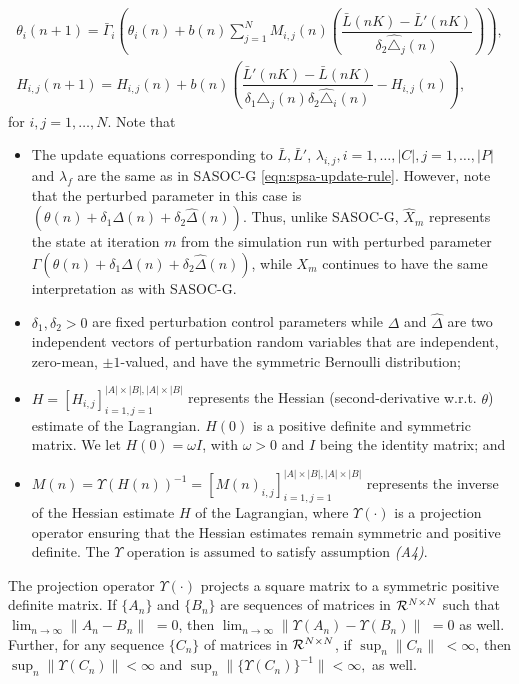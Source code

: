 \documentclass[11pt,letterpaper,english]{article}
\begin{document}
\begin{align}
\label{eqn:hessian-update-rule}
\theta_{i}(n+1)  =  \bar\Gamma_i \left( \theta_{i}(n) + b(n)
\sum\limits_{j = 1}^{N} M_{i, j}(n) \left(\dfrac{\bar{L}(nK) - \bar{L}'(nK)}{\delta_2 \widehat\triangle_{j}(n)}
\right) \right),\\
H_{i, j}(n + 1) = H_{i, j}(n) + b(n) \left ( \dfrac{\bar{L}'(nK) - \bar{L}(nK)}{\delta_1 \triangle_{j}(n) \delta_2 \widehat\triangle_{i}(n)} - H_{i, j}(n) \right ),
\end{align}
for $i,j=1,\ldots,N$. Note that
\begin{itemize}[$\bullet$]
\item The update equations corresponding to $\bar L, \bar{L}'$, $\lambda_{i,j}, i=1,\ldots,|C|, j=1,\ldots,|P|$ and $\lambda_f$ are the same as in SASOC-G \eqref{eqn:spsa-update-rule}. However, note that the perturbed parameter in this case is $(\theta(n) + \delta_1\Delta(n) + \delta_2 \widehat\Delta(n))$. Thus, 
unlike SASOC-G, $\hat{X}_m$ represents the state at iteration $m$ from the simulation run with 
perturbed parameter $\Gamma(\theta(n) + \delta_1\Delta(n) + \delta_2 \widehat\Delta(n))$, 
while $X_m$ continues to have the same interpretation as with SASOC-G.
\item $\delta_1, \delta_2 > 0$ are fixed perturbation control parameters while
$\Delta$ and $\widehat\Delta$ are two independent vectors of perturbation random
variables that are independent, zero-mean, $\pm 1$-valued, and have the symmetric
Bernoulli distribution;
\item $H = [H_{i,j}]_{i = 1,j = 1}^{|A|\times |B|, |A|\times |B|}$ represents
the Hessian (second-derivative w.r.t. $\theta$) estimate of the Lagrangian.
$H(0)$ is a positive definite and symmetric matrix. We let $H(0) =  \omega I$,
with $\omega > 0$ and $I$ being the identity matrix; and
\item $M(n) = \Upsilon(H(n))^{-1}= [M(n)_{i,j}]_{i = 1,j = 1}^{|A|\times |B|, |A|\times |B|}$ represents the inverse of the Hessian estimate $H$ of the Lagrangian, where $\Upsilon(\cdot)$ is a projection operator ensuring that the Hessian estimates remain symmetric and positive definite. The $\Upsilon$ operation is assumed to satisfy assumption \textit{(A4)}.
\end{itemize}

\vspace{4pt}

\vspace{4pt}
\noindent The projection operator $\Upsilon(\cdot)$ projects a square matrix to a symmetric positive definite matrix. If $\{A_n\}$ and $\{B_n\}$ are sequences of matrices in ${\cal R}^{N\times N}$
such that ${\displaystyle \lim_{n\rightarrow \infty} \parallel A_n-B_n \parallel}$ $= 0$,
then ${\displaystyle \lim_{n\rightarrow \infty} \parallel \Upsilon(A_n)- \Upsilon(B_n) \parallel}$
$= 0$
as well. Further, for any sequence $\{C_n\}$ of matrices in ${\cal R}^{N\times N}$,
if ${\displaystyle \sup_n \parallel C_n\parallel}$
$<\infty$,
then $\sup_n \parallel \Upsilon(C_n)\parallel < \infty$ and
$\sup_n \parallel \{\Upsilon(C_n)\}^{-1} \parallel <\infty,$ as well.
\end{document}
